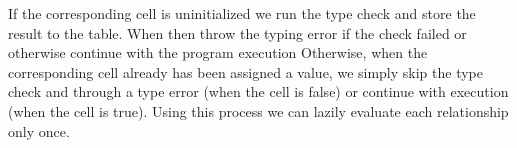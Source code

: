 If the corresponding cell is uninitialized
we run the type check and store the result to the table.
When then throw the typing error if the check failed
or otherwise continue with the program execution 
Otherwise, when the corresponding cell already has been assigned a value,
we simply skip the type check and through a type error (when the cell is false)
or continue with execution (when the cell is true).
Using this process we can lazily evaluate each relationship only once.

